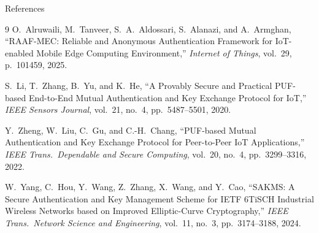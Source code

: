 \begin{frame}[allowframebreaks]{References}
\begin{thebibliography}{9}
        O.\ Alruwaili, M.\ Tanveer, S.\ A.\ Aldossari, S.\ Alanazi, and A.\ Armghan,
        ``RAAF-MEC: Reliable and Anonymous Authentication Framework for
        IoT-enabled Mobile Edge Computing Environment,''
        \emph{Internet of Things}, vol.\ 29, p.\ 101459, 2025.

        S.\ Li, T.\ Zhang, B.\ Yu, and K.\ He,
        ``A Provably Secure and Practical PUF-based End-to-End Mutual
        Authentication and Key Exchange Protocol for IoT,''
        \emph{IEEE Sensors Journal}, vol.\ 21, no.\ 4, pp.\ 5487--5501, 2020.

        Y.\ Zheng, W.\ Liu, C.\ Gu, and C.-H.\ Chang,
        ``PUF-based Mutual Authentication and Key Exchange Protocol for
        Peer-to-Peer IoT Applications,''
        \emph{IEEE Trans.\ Dependable and Secure Computing}, vol.\ 20, no.\ 4,
        pp.\ 3299--3316, 2022.

        W.\ Yang, C.\ Hou, Y.\ Wang, Z.\ Zhang, X.\ Wang, and Y.\ Cao,
        ``SAKMS: A Secure Authentication and Key Management Scheme for
        IETF 6TiSCH Industrial Wireless Networks based on Improved
        Elliptic-Curve Cryptography,''
        \emph{IEEE Trans.\ Network Science and Engineering}, vol.\ 11, no.\ 3,
        pp.\ 3174--3188, 2024.
    \end{thebibliography}
\end{frame}
